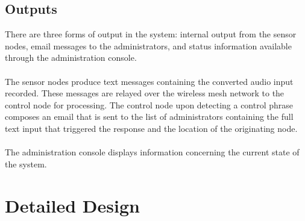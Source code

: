 \documentclass[11pt,a4paper]{article}
\begin{document}
\subsection{Outputs}
There are three forms of output in the system: internal output from the sensor nodes, email messages to the administrators, and status information available through the administration console. \\\\
The sensor nodes produce text messages containing the converted audio input recorded.  These messages are relayed over the wireless mesh network to the control node for processing.  The control node upon detecting a control phrase composes an email that is sent to the list of administrators containing the full text input that triggered the response and the location of the originating node. \\\\
The administration console displays information concerning the current state of the system.

\section{Detailed Design}
\end{document}

